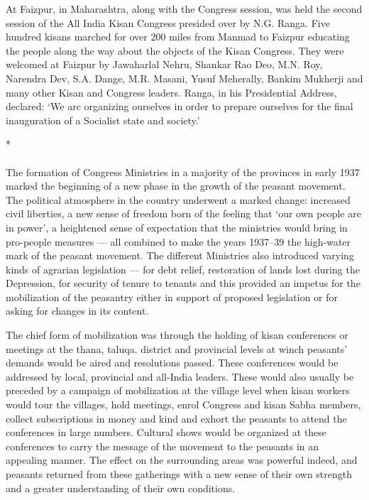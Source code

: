 At Faizpur, in Maharashtra, along with the Congress session, was held the second session of the All India Kisan Congress presided over by N.G. Ranga. Five hundred kisans marched for over 200 miles from Manmad to Faizpur educating the people along the way about the objects of the Kisan Congress. They were welcomed at Faizpur by Jawaharlal Nehru, Shankar Rao Deo, M.N. Roy, Narendra Dev, S.A. Dange, M.R. Masani, Yusuf Meherally, Bankim Mukherji and many other Kisan and Congress leaders. Ranga, in his Presidential Address, declared: `We arc organizing ourselves in order to prepare ourselves for the final inauguration of a Socialist state and society.'

\begin{center}*\end{center}

\paragraph*{}

The formation of Congress Ministries in a majority of the provinces in early 1937 marked the beginning of a new phase in the growth of the peasant movement. The political atmosphere in the country underwent a marked change: increased civil liberties, a new sense of freedom born of the feeling that `our own people are in power', a heightened sense of expectation that the ministries would bring in pro-people measures --- all combined to make the years 1937--39 the high-water mark of the peasant movement. The different Ministries also introduced varying kinds of agrarian legislation --- for debt relief, restoration of lands lost during the Depression, for security of tenure to tenants and this provided an impetus for the mobilization of the peasantry either in support of proposed legislation or for asking for changes in its content.

The chief form of mobilization was through the holding of kisan conferences or meetings at the thana, taluqa. district and provincial levels at winch peasants' demands would be aired and resolutions passed. These conferences would be addressed by local, provincial and all-India leaders. These would also usually be preceded by a campaign of mobilization at the village level when kisan workers would tour the villages, hold meetings, enrol Congress and kisan Sabha members, collect subscriptions in money and kind and exhort the peasants to attend the conferences in large numbers. Cultural shows would be organized at these conferences to carry the message of the movement to the peasants in an appealing manner. The effect on the surrounding areas was powerful indeed, and peasants returned from these gatherings with a new sense of their own strength and a greater understanding of their own conditions.

